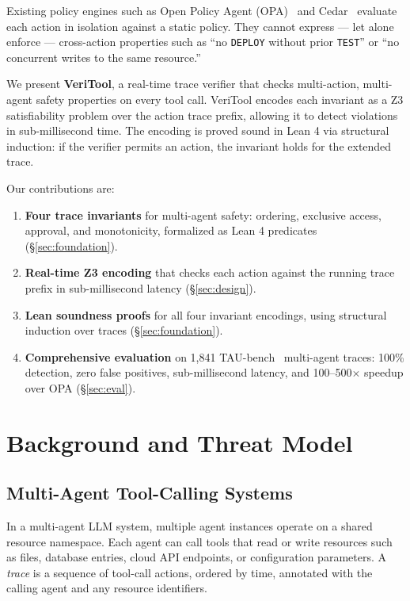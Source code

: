 \documentclass[10pt,twocolumn]{article}
\begin{document}
Existing policy engines such as Open Policy Agent (OPA)~\cite{opa} and
Cedar~\cite{cedar} evaluate each action in isolation against a static
policy. They cannot express --- let alone enforce --- cross-action
properties such as ``no \texttt{DEPLOY} without prior \texttt{TEST}''
or ``no concurrent writes to the same resource.''

We present \textbf{VeriTool}, a real-time trace verifier that checks
multi-action, multi-agent safety properties on every tool call.
VeriTool encodes each invariant as a Z3 satisfiability problem over
the action trace prefix, allowing it to detect violations in sub-millisecond
time. The encoding is proved sound in Lean 4 via structural induction:
if the verifier permits an action, the invariant holds for the extended
trace.

Our contributions are:

\begin{enumerate}
\item \textbf{Four trace invariants} for multi-agent safety: ordering,
  exclusive access, approval, and monotonicity, formalized as Lean 4
  predicates (\S\ref{sec:foundation}).
\item \textbf{Real-time Z3 encoding} that checks each action against the
  running trace prefix in sub-millisecond latency (\S\ref{sec:design}).
\item \textbf{Lean soundness proofs} for all four invariant encodings,
  using structural induction over traces (\S\ref{sec:foundation}).
\item \textbf{Comprehensive evaluation} on 1,841 TAU-bench~\cite{taubench}
  multi-agent traces: 100\% detection, zero false positives, sub-millisecond
  latency, and 100--500$\times$ speedup over OPA (\S\ref{sec:eval}).
\end{enumerate}

\section{Background and Threat Model}
\label{sec:background}

\subsection{Multi-Agent Tool-Calling Systems}

In a multi-agent LLM system, multiple agent instances operate on a shared
resource namespace. Each agent can call tools that read or write resources
such as files, database entries, cloud API endpoints, or configuration
parameters. A \emph{trace} is a sequence of tool-call actions, ordered by
time, annotated with the calling agent and any resource identifiers.
\end{document}
